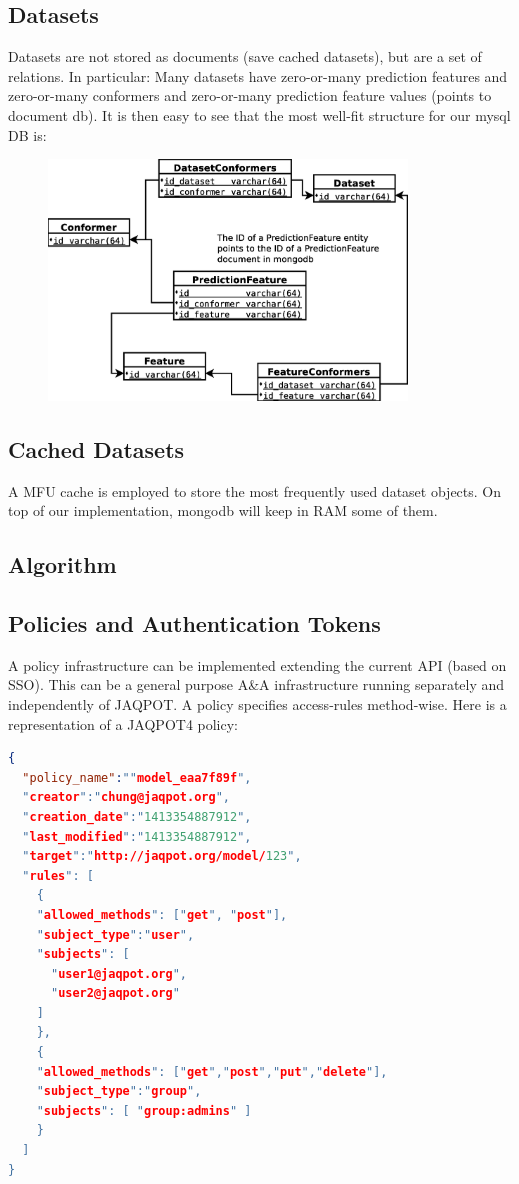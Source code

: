 \subsection{Datasets}
Datasets are not stored as documents (save cached datasets), but are a set of relations. In particular:
Many datasets have zero-or-many prediction features and zero-or-many conformers and zero-or-many 
prediction feature values (points to document db).
It is then easy to see that the most well-fit structure for our mysql DB is:

\begin{figure}[h]
 \centering
 \includegraphics[keepaspectratio=true,width=0.85\textwidth]{figures/JAQPOT_Quattro_RDB}
\end{figure}


\subsection{Cached Datasets}
A MFU cache is employed to store the most frequently used dataset objects. 
On top of our implementation, mongodb will keep in RAM some of them.

\subsection{Algorithm}


\subsection{Policies and Authentication Tokens}
A policy infrastructure can be implemented extending the current API 
(based on SSO). This can be a general purpose A\&A infrastructure running separately 
and independently of JAQPOT. A policy specifies access-rules method-wise. 
Here is a representation of a JAQPOT4 policy:
\begin{lstlisting}[language=json]
{
  "policy_name":""model_eaa7f89f",
  "creator":"chung@jaqpot.org",
  "creation_date":"1413354887912",
  "last_modified":"1413354887912",
  "target":"http://jaqpot.org/model/123",
  "rules": [
    {
    "allowed_methods": ["get", "post"],
    "subject_type":"user",
    "subjects": [
      "user1@jaqpot.org",
      "user2@jaqpot.org"
    ]
    },
    {
    "allowed_methods": ["get","post","put","delete"],
    "subject_type":"group",
    "subjects": [ "group:admins" ]
    }
  ]
}
\end{lstlisting}

